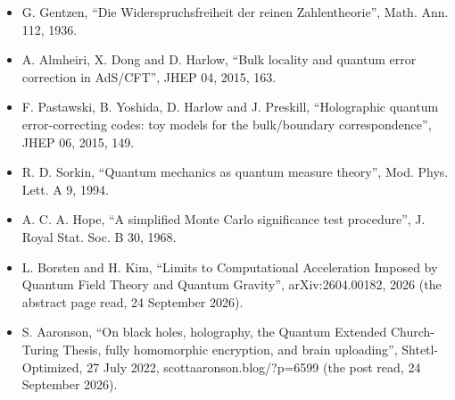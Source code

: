 \begin{itemize}
\item G. Gentzen, “Die Widerspruchsfreiheit der reinen Zahlentheorie”, Math. Ann. 112, 1936.
\item A. Almheiri, X. Dong and D. Harlow, “Bulk locality and quantum error correction in AdS/CFT”, JHEP 04, 2015, 163.
\item F. Pastawski, B. Yoshida, D. Harlow and J. Preskill, “Holographic quantum error-correcting codes: toy models for the bulk/boundary correspondence”, JHEP 06, 2015, 149.
\item R. D. Sorkin, “Quantum mechanics as quantum measure theory”, Mod. Phys. Lett. A 9, 1994.
\item A. C. A. Hope, “A simplified Monte Carlo significance test procedure”, J. Royal Stat. Soc. B 30, 1968.
\item L. Borsten and H. Kim, “Limits to Computational Acceleration Imposed by Quantum Field Theory and Quantum Gravity”, arXiv:2604.00182, 2026 (the abstract page read, 24 September 2026).
\item S. Aaronson, “On black holes, holography, the Quantum Extended Church-Turing Thesis, fully homomorphic encryption, and brain uploading”, Shtetl-Optimized, 27 July 2022, scottaaronson.blog/?p=6599 (the post read, 24 September 2026).
\end{itemize}
